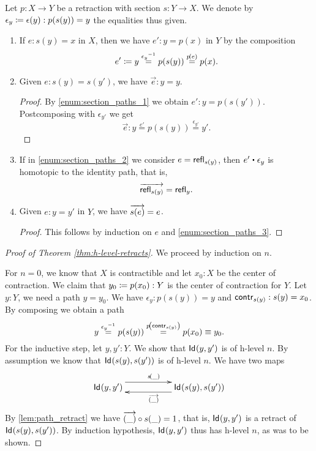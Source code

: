 \begin{lem}\label{lem:path_retract}
 Let $p \colon X \to Y$ be a retraction with section $s \colon Y \to X$.
 We denote by $\epsilon_y \defeq \epsilon(y) : p(s(y)) = y$ the equalities thus given.
 \begin{enumerate}
  \item \label{enum:section_paths_1}
      If $e : s(y) = x$ in $X$, then we have $e' :  y = p(x)$ in $Y$
        by the composition
     \[e' \defeq y \stackrel{\opp{\epsilon_y}}{=} p(s(y)) \stackrel{\map{p}{e}}{=} p(x)  .\]

  \item \label{enum:section_paths_2}
      Given $e : s(y) = s(y')$, we have $\vec e : y = y$.
     \begin{proof}
	By \ref{enum:section_paths_1} we obtain $e' : y = p(s(y'))$.
        Postcomposing with $\epsilon_{y'}$ we get
           \[ \overrightarrow{e} : y \stackrel{e'}{=} p(s(y)) \stackrel{\epsilon_{y'}}{=} y'  . \]
     \end{proof}

  \item \label{enum:section_paths_3}
        If in \ref{enum:section_paths_2} we consider $e = \refl{s(y)}$, then $e' \ct \epsilon_{y}$
        is homotopic to the identity path, that is,
          \[ \overrightarrow{\refl{s(y)}} = \refl{y}  . \]

  \item Given $e : y = y'$ in $Y$, we have $\overrightarrow{\map{s}{e}} = e$.
      \begin{proof}
       This follows by induction on $e$ and \ref{enum:section_paths_3}.
      \end{proof}

 \end{enumerate}

\end{lem}


\begin{proof}[Proof of Theorem \autoref{thm:h-level-retracts}]
 We proceed by induction on $n$.
 
 For $n=0$, we know that $X$ is contractible and let $x_0 : X$ be the center of contraction.
 We claim that $y_0 \defeq p(x_0) : Y$ is the center of contraction for $Y$.
 Let $y : Y$, we need a path $y = y_0$. We have $\epsilon_y : p(s(y)) = y$ and $\contr_{s(y)} : s(y) = x_0$.
 By composing we obtain a path
 \[ y \stackrel{\opp{\epsilon_y}}{=} p(s(y)) \stackrel{\map{p}{\contr_{s(y)}}}{=} p(x_0) \equiv y_0  . \]
 For the inductive step, let $y, y' : Y$. We show that $\idtype {y}{y'}$ is of h-level $n$.
 By assumption we know that $\idtype{s(y)}{s(y')}$ is of h-level $n$.
 We have two maps
 \[\xymatrix{\idtype{y}{y'} \ar@<1.5ex>[rr]^{\map{s}{\_}} & & \idtype{s(y)}{s(y')} \ar@<1.2ex>[ll]^{\overrightarrow{(\_)}}}\]
  By \autoref{lem:path_retract} we have $\comp{\map{s}{\_}}{\overrightarrow{(\_)}} = 1$,
   that is, $\idtype {y}{y'}$ is a retract of $\idtype{s(y)}{s(y')}$.
    By induction hypothesis, $\idtype {y}{y'}$ thus has
   h-level $n$, as was to be shown.
\end{proof}

